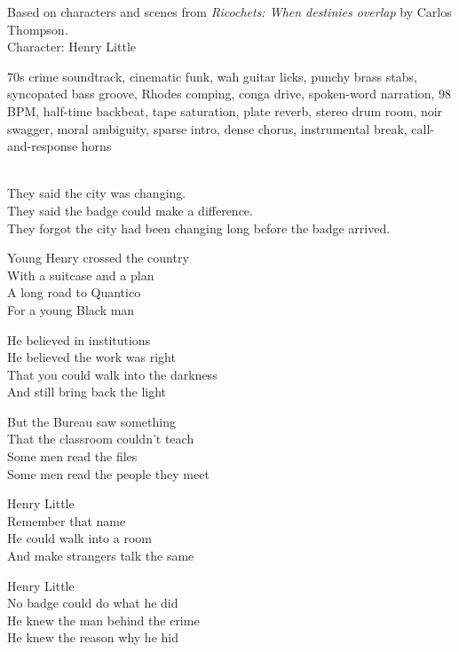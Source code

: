 
\begin{notes}
Based on characters and scenes from \emph{Ricochets: When destinies overlap} by Carlos Thompson.\\
Character: Henry Little
\end{notes}
\begin{style}
70s crime soundtrack, cinematic funk, wah guitar licks, punchy brass stabs, syncopated bass groove, Rhodes comping, conga drive, spoken-word narration, 98 BPM, half-time backbeat, tape saturation, plate reverb, stereo drum room, noir swagger, moral ambiguity, sparse intro, dense chorus, instrumental break, call-and-response horns
\end{style}
\begin{lyrics}
\\
They said the city was changing.\\
They said the badge could make a difference.\\
They forgot the city had been changing long before the badge arrived.

Young Henry crossed the country\\
With a suitcase and a plan\\
A long road to Quantico\\
For a young Black man

He believed in institutions\\
He believed the work was right\\
That you could walk into the darkness\\
And still bring back the light

But the Bureau saw something\\
That the classroom couldn't teach\\
Some men read the files\\
Some men read the people they meet

Henry Little\\
Remember that name\\
He could walk into a room\\
And make strangers talk the same

Henry Little\\
No badge could do what he did\\
He knew the man behind the crime\\
He knew the reason why he hid


\end{lyrics}
